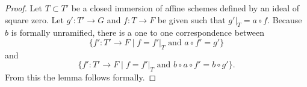 \documentclass[10pt,a4paper]{amsart}
\theoremstyle{plain}
\theoremstyle{definition}
\theoremstyle{remark}
\numberwithin{equation}{subsection}
\begin{document}
\begin{proof}
Let $T \subset T'$ be a closed immersion of affine schemes defined by an ideal
of square zero. Let $g' : T' \to G$ and $f : T \to F$ be given such that
$g'|_T = a \circ f$. Because $b$ is formally unramified, there is a one
to one correspondence between
$$
\{f' : T' \to F \mid f = f'|_T\text{ and }a \circ f' = g'\}
$$
and
$$
\{f' : T' \to F \mid f = f'|_T\text{ and }b \circ a \circ f' = b \circ g'\}.
$$
From this the lemma follows formally.
\end{proof}
\end{document}
